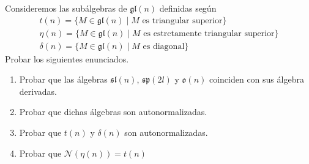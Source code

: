 \documentclass[twoside]{article}
\begin{document}
\begin{ejercicio}{2}
Consideremos las subálgebras de $\mathfrak{gl}(n)$ definidas según
\begin{gather*}
t(n) = \{ M \in \mathfrak{gl}(n) \mid M\text{ es triangular superior}\}
\\
\eta(n) = \{ M \in \mathfrak{gl}(n) \mid M\text{ es estrctamente triangular superior}\}\\
\delta(n) = \{ M \in \mathfrak{gl}(n) \mid M\text{ es diagonal}\}
\end{gather*}
Probar los siguientes enunciados.
\begin{enumerate}
\item Probar que las álgebras $\mathfrak{sl}(n)$, $\mathfrak{sp}(2l)$ y $\mathfrak{o}(n)$ coinciden con sus álgebra derivadas.
\item Probar que dichas álgebras son autonormalizadas.
\item Probar que $t(n)$ y $\delta(n)$ son autonormalizadas.
\item Probar que $\mathcal{N}(\eta(n)) = t(n)$
\end{enumerate}
\end{ejercicio}
\end{document}
